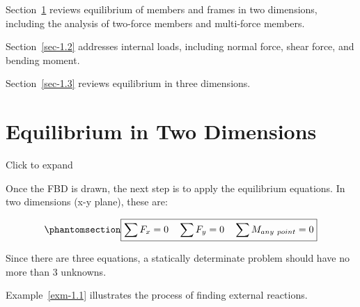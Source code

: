 \documentclass[
  letterpaper,
  DIV=11,
  numbers=noendperiod]{scrreprt}
\theoremstyle{definition}
\theoremstyle{remark}
\begin{document}
Section~\ref{sec-1.1} reviews equilibrium of members and frames in two
dimensions, including the analysis of two-force members and multi-force
members.

Section~\ref{sec-1.2} addresses internal loads, including normal force,
shear force, and bending moment.

Section~\ref{sec-1.3} reviews equilibrium in three dimensions.

\section{Equilibrium in Two Dimensions}\label{sec-1.1}

Click to expand

Once the FBD is drawn, the next step is to apply the equilibrium
equations. In two dimensions (x-y plane), these are:

\begin{equation}\phantomsection\label{eq-1.1}{
\boxed{\sum F_x=0 \quad \sum F_y=0 \quad \sum M_{any~point}=0}
}\end{equation}

Since there are three equations, a statically determinate problem should
have no more than 3 unknowns.

Example~\ref{exm-1.1} illustrates the process of finding external
reactions.
\end{document}
